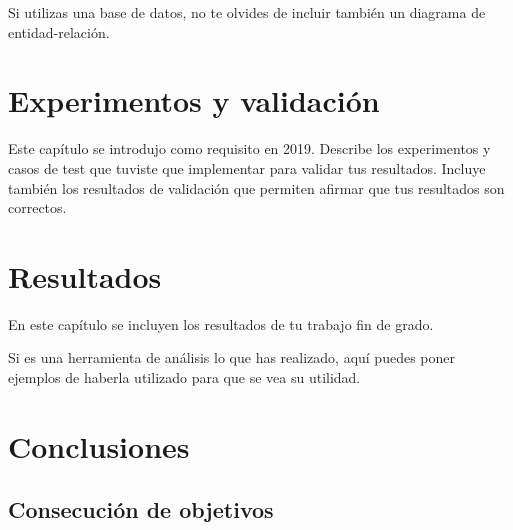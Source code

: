 \documentclass[a4paper, 12pt]{book}
\begin{document}
Si utilizas una base de datos, no te olvides de incluir también un diagrama de entidad-relación.



\cleardoublepage
\chapter{Experimentos y validación}
\label{chap:experimentos}

Este capítulo se introdujo como requisito en 2019. 
Describe los experimentos y casos de test que tuviste que implementar para validar tus resultados. 
Incluye también los resultados de validación que permiten afirmar que tus resultados son correctos. 



\cleardoublepage
\chapter{Resultados}
\label{chap:resultados}

En este capítulo se incluyen los resultados de tu trabajo fin de grado.

Si es una herramienta de análisis lo que has realizado, aquí puedes poner ejemplos de haberla utilizado para que se vea su utilidad.



\cleardoublepage
\chapter{Conclusiones}
\label{chap:conclusiones}


\section{Consecución de objetivos}
\label{sec:consecucion-objetivos}
\end{document}
